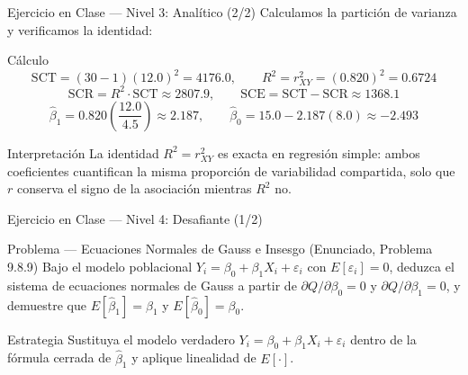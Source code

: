 \documentclass[10pt, aspectratio=169]{beamer}
\begin{document}
\begin{frame}{Ejercicio en Clase --- Nivel 3: Analítico (2/2)}
  \scriptsize
  Calculamos la partición de varianza y verificamos la identidad: \pause

  \vspace{0.05cm}
  \begin{block}{Cálculo}
    \scriptsize
    $$\text{SCT}=(30-1)(12.0)^2=4176.0, \qquad R^2=r_{XY}^2=(0.820)^2=0.6724$$
    $$\text{SCR}=R^2\cdot\text{SCT}\approx2807.9, \qquad \text{SCE}=\text{SCT}-\text{SCR}\approx1368.1$$
    $$\hat\beta_1=0.820\left(\frac{12.0}{4.5}\right)\approx2.187, \qquad \hat\beta_0=15.0-2.187(8.0)\approx-2.493$$
  \end{block}

  \vspace{0.05cm}
  \pause
  \begin{alertblock}{Interpretación}
    \scriptsize
    La identidad $R^2=r_{XY}^2$ es exacta en regresión simple: ambos coeficientes cuantifican la misma proporción de variabilidad compartida, solo que $r$ conserva el signo de la asociación mientras $R^2$ no.
  \end{alertblock}
\end{frame}

\begin{frame}{Ejercicio en Clase --- Nivel 4: Desafiante (1/2)}
  \footnotesize
  \begin{block}{Problema --- Ecuaciones Normales de Gauss e Insesgo (Enunciado, Problema 9.8.9)}
    Bajo el modelo poblacional $Y_i=\beta_0+\beta_1 X_i+\varepsilon_i$ con $E[\varepsilon_i]=0$, deduzca el sistema de ecuaciones normales de Gauss a partir de $\partial Q/\partial\beta_0=0$ y $\partial Q/\partial\beta_1=0$, y demuestre que $E[\hat\beta_1]=\beta_1$ y $E[\hat\beta_0]=\beta_0$.
  \end{block}

  \vspace{0.1cm}
  \pause
  \begin{alertblock}{Estrategia}
    \scriptsize
    Sustituya el modelo verdadero $Y_i=\beta_0+\beta_1X_i+\varepsilon_i$ dentro de la fórmula cerrada de $\hat\beta_1$ y aplique linealidad de $E[\cdot]$.
  \end{alertblock}
\end{frame}
\end{document}
